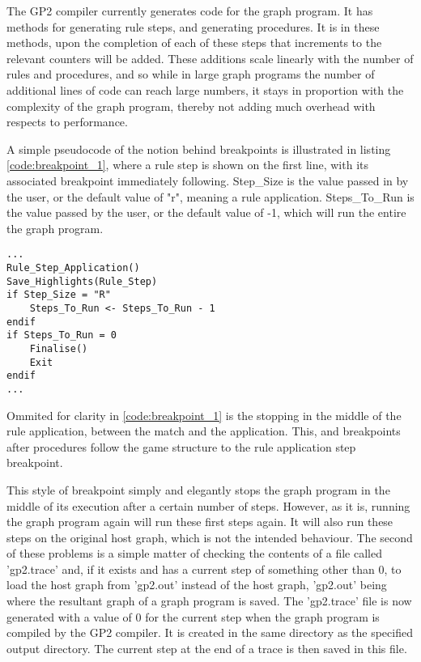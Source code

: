 \documentclass{UoYCSproject}
\begin{document}
The GP2 compiler currently generates code for the graph program. It has methods for generating rule steps, and generating procedures. It is in these methods, upon the completion of each of these steps that increments to the relevant counters will be added. These additions scale linearly with the number of rules and procedures, and so while in large graph programs the number of additional lines of code can reach large numbers, it stays in proportion with the complexity of the graph program, thereby not adding much overhead with respects to performance.

A simple pseudocode of the notion behind breakpoints is illustrated in listing \ref{code:breakpoint_1}, where a rule step is shown on the first line, with its associated breakpoint immediately following. Step\_Size is the value passed in by the user, or the default value of "r", meaning a rule application. Steps\_To\_Run is the value passed by the user, or the default value of -1, which will run the entire the graph program.

\begin{lstlisting}[label=code:breakpoint_1, caption=Pseudocode of breakpoints]
...
Rule_Step_Application()
Save_Highlights(Rule_Step)
if Step_Size = "R"
    Steps_To_Run <- Steps_To_Run - 1
endif
if Steps_To_Run = 0
    Finalise()
    Exit
endif
...
\end{lstlisting}

Ommited for clarity in \ref{code:breakpoint_1} is the stopping in the middle of the rule application, between the match and the application. This, and breakpoints after procedures follow the game structure to the rule application step breakpoint.

This style of breakpoint simply and elegantly stops the graph program in the middle of its execution after a certain number of steps. However, as it is, running the graph program again will run these first steps again. It will also run these steps on the original host graph, which is not the intended behaviour. The second of these problems is a simple matter of checking the contents of a file called 'gp2.trace' and, if it exists and has a current step of something other than 0, to load the host graph from 'gp2.out' instead of the host graph, 'gp2.out' being where the resultant graph of a graph program is saved. The 'gp2.trace' file is now generated with a value of 0 for the current step when the graph program is compiled by the GP2 compiler. It is created in the same directory as the specified output directory. The current step at the end of a trace is then saved in this file. 
\end{document}
